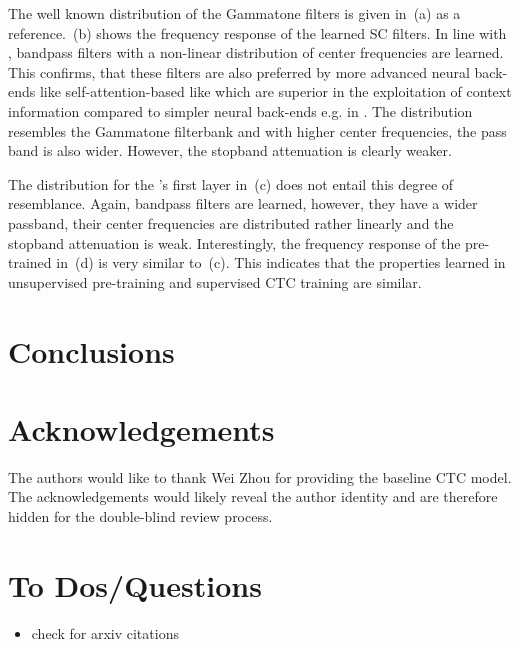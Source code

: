 \documentclass{INTERSPEECH2023}
\begin{document}
The well known distribution of the Gammatone filters is given in \,(a) as a reference.
\,(b) shows the frequency response of the learned \gls{SC} filters.
In line with \cite{tuske2018:waveform}, bandpass filters with a non-linear distribution of center frequencies are learned.
This confirms, that these filters are also preferred by more advanced neural back-ends like self-attention-based like \conformer which are superior in the exploitation of context information compared to simpler neural back-ends e.g. in \cite{tuske2014raw}.
The distribution resembles the Gammatone filterbank and with higher center frequencies, the pass band is also wider.
However, the stopband attenuation is clearly weaker.

The distribution for the \wvtwo \fe's first layer in \,(c) does not entail this degree of resemblance.
Again, bandpass filters are learned, however, they have a wider passband, their center frequencies are distributed rather linearly and the stopband attenuation is weak.
Interestingly, the frequency response of the pre-trained \wvtwo \fe in \,(d) is very similar to \,(c).
This indicates that the properties learned in unsupervised pre-training and supervised \gls{CTC} training are similar.

\section{Conclusions}

\section{Acknowledgements}

\ifinterspeechfinal
     The authors would like to thank Wei Zhou for providing the baseline \gls{CTC} model.
\else
     The acknowledgements would likely reveal the author identity and are therefore hidden for the double-blind review process.
\fi

{
\color{red}
\section{To Dos/Questions}
\begin{itemize}
  \item check for arxiv citations
\end{itemize}
}



\end{document}
